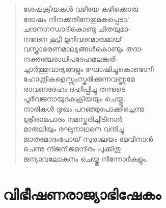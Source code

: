 \begin{verse}
ശേഷക്രിയകള്‍ വഴിയേ കഴിക്കൊരു\\
ദോഷം നിനക്കതിനേതുമകപ്പെടാ.’\\
ചന്ദനഗന്ധാദികൊണ്ടു ചിതയുമാ-\\
നന്ദേന കൂട്ടി മുനിവരന്മാരുമായ്\\
വസ്ത്രാഭരണമാല്യങ്ങള്‍കൊണ്ടും തദാ-\\
നക്തഞ്ചരാധിപദേഹമലങ്കരി-\\
ച്ചാര്‍ത്തുവാദ്യങ്ങളും ഘോഷിച്ചുകൊണ്ടഗ്നി-\\
ഹോത്രികളെസ്സംസ്കരിക്കുന്നവണ്ണമേ\\
രാവണദേഹം ദഹിപ്പിച്ചു തന്നുടെ\\
പൂര്‍വജനായുദകക്രിയയും ചെയ്തു.\\
നാരികള്‍ ദുഃഖം പറഞ്ഞുപോക്കിച്ചെന്നു\\
ശ്രീരാമപാദം നമസ്കരിച്ചീടിനാര്‍.\\
മാതലിയും രഘുനാഥനെ വന്ദിച്ചു\\
ജാതമോദംപോയ് സുരാലയം മേവിനാന്‍.\\
ചെന്നു നിജനിജമന്ദിരം പുക്കിതു\\
ജന്യാവലോകനം ചെയ്തു നിന്നോര്‍കളും.
\end{verse}


\section{വിഭീഷണരാജ്യാഭിഷേകം}

